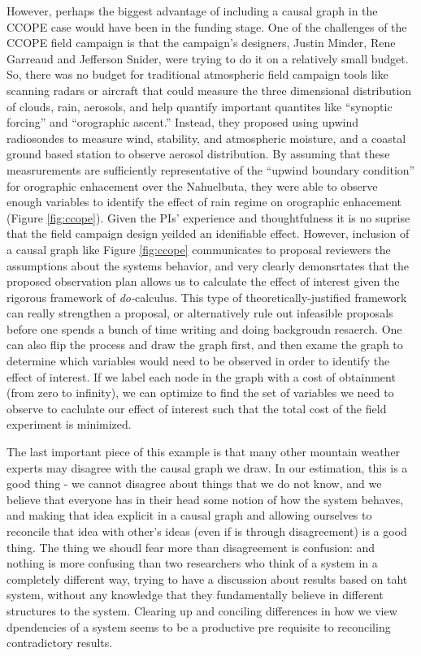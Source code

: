 \documentclass[12pt]{article}
\begin{document}
However, perhaps the biggest advantage of including a causal graph in
the CCOPE case would have been in the funding stage. One of the
challenges of the CCOPE field campaign is that the campaign's
designers, Justin Minder, Rene Garreaud and Jefferson Snider, were
trying to do it on a relatively small budget. So, there was no budget
for traditional atmospheric field campaign tools like scanning radars
or aircraft that could measure the three dimensional distribution of
clouds, rain, aerosols, and help quantify important quantites like
``synoptic forcing'' and ``orographic ascent.'' Instead, they proposed
using upwind radiosondes to measure wind, stability, and atmospheric
moisture, and a coastal ground based station to observe aerosol
distribution. By assuming that these measrurements are sufficiently
representative of the ``upwind boundary condition'' for orographic
enhacement over the Nahuelbuta, they were able to observe enough
variables to identify the effect of rain regime on orographic
enhacement (Figure \ref{fig:ccope}). Given the PIs' experience and
thoughtfulness it is no suprise that the field campaign design yeilded
an idenifiable effect. However, inclusion of a causal graph like
Figure \ref{fig:ccope} communicates to proposal reviewers the
assumptions about the systems behavior, and very clearly demonsrtates
that the proposed observation plan allows us to calculate the effect
of interest given the rigorous framework of \textit{do-}calculus. This
type of theoretically-justified framework can really strengthen a
proposal, or alternatively rule out infeasible proposals before one
spends a bunch of time writing and doing backgroudn resaerch. One can
also flip the process and draw the graph first, and then exame the
graph to determine which variables would need to be observed in order
to identify the effect of interest. If we label each node in the graph
with a cost of obtainment (from zero to infinity), we can optimize to
find the set of variables we need to observe to caclulate our effect
of interest such that the total cost of the field experiment is
minimized.

The last important piece of this example is that many other mountain
weather experts may disagree with the causal graph we draw. In our
estimation, this is a good thing - we cannot disagree about things
that we do not know, and we believe that everyone has in their head
some notion of how the system behaves, and making that idea explicit
in a causal graph and allowing ourselves to reconcile that idea with
other's ideas (even if is through disagreement) is a good thing. The
thing we shoudl fear more than disagreement is confusion: and nothing
is more confusing than two researchers who think of a system in a
completely different way, trying to have a discussion about results
based on taht system, without any knowledge that they fundamentally
believe in different structures to the system. Clearing up and
conciling differences in how we view dpendencies of a system seems to
be a productive pre requisite to reconciling contradictory results.
\end{document}
